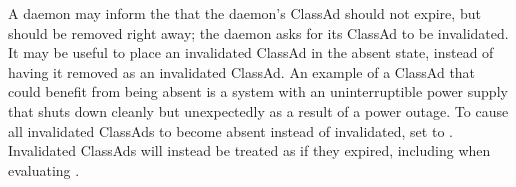 A daemon may inform the  that the daemon's
ClassAd should not expire, but should be removed right away;
the daemon asks for its ClassAd to be invalidated.
It may be useful to place an invalidated ClassAd in the absent state,
instead of having it removed as an invalidated ClassAd.
An example of a ClassAd that could benefit from being absent
is a system with an uninterruptible power supply that shuts
down cleanly but unexpectedly as a result of a power outage.
To cause all invalidated ClassAds to become absent instead of invalidated, 
set  to .
Invalidated ClassAds will instead be treated as if they expired, 
including when evaluating .
